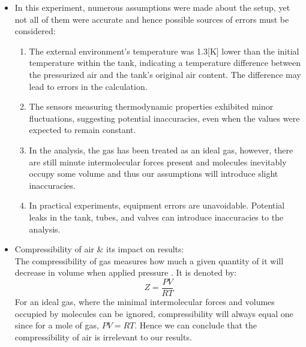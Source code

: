 \documentclass[12pt]{article}
\begin{document}
\begin{itemize}
    \item In this experiment, numerous assumptions were made about the setup, yet not all of them were accurate and hence possible sources of errors must be considered:\\
    \begin{enumerate}
        \item The external environment's temperature was 1.3[K] lower than the initial temperature within the tank, indicating a temperature difference between the pressurized air and the tank's original air content. The difference may lead to errors in the calculation.
        \item The sensors measuring thermodynamic properties exhibited minor fluctuations, suggesting potential inaccuracies, even when the values were expected to remain constant.
        \item In the analysis, the gas has been treated as an ideal gas, however, there are still minute intermolecular forces present and molecules inevitably occupy some volume and thus our assumptions will introduce slight inaccuracies.
        \item In practical experiments, equipment errors are unavoidable. Potential leaks in the tank, tubes, and valves can introduce inaccuracies to the analysis.
    \end{enumerate}
    \item Compressibility of air \& its impact on results:\\
    The compressibility of gas measures how much a given quantity of it will decrease in volume when applied pressure \autocite{al-raeei2020formula}. It is denoted by:
    \begin{equation}
        Z=\frac{PV}{RT}
    \end{equation}
    For an ideal gas, where the minimal intermolecular forces and volumes occupied by molecules can be ignored, compressibility will always equal one since for a mole of gas, $PV=RT$. Hence we can conclude that the compressibility of air is irrelevant to our results.
\end{itemize}
\end{document}
